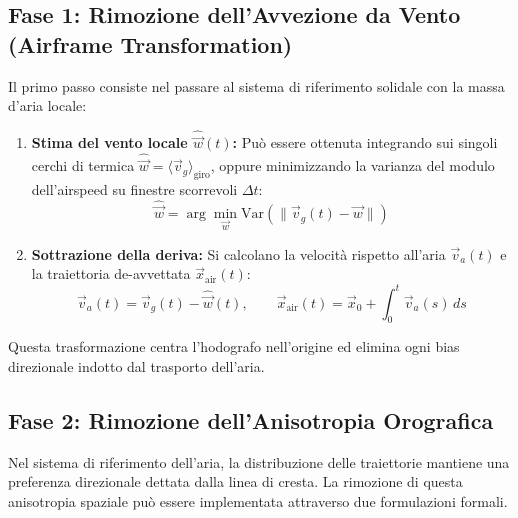 \documentclass[11pt,a4paper]{article}
\begin{document}
\subsection{Fase 1: Rimozione dell'Avvezione da Vento (Airframe Transformation)}
Il primo passo consiste nel passare al sistema di riferimento solidale con la massa d'aria locale:
\begin{enumerate}
    \item \textbf{Stima del vento locale $\hat{\vec{w}}(t)$:}
    Pu\`o essere ottenuta integrando sui singoli cerchi di termica $\hat{\vec{w}} = \langle \vec{v}_g \rangle_{\text{giro}}$, oppure minimizzando la varianza del modulo dell'airspeed su finestre scorrevoli $\Delta t$:
    \begin{equation}
        \hat{\vec{w}} = \arg\min_{\vec{w}} \mathrm{Var}\left( \|\vec{v}_g(t) - \vec{w}\| \right)
    \end{equation}
    \item \textbf{Sottrazione della deriva:}
    Si calcolano la velocit\`a rispetto all'aria $\vec{v}_a(t)$ e la traiettoria de-avvettata $\vec{x}_{\text{air}}(t)$:
    \begin{equation}
        \vec{v}_a(t) = \vec{v}_g(t) - \hat{\vec{w}}(t), \qquad \vec{x}_{\text{air}}(t) = \vec{x}_0 + \int_0^t \vec{v}_a(s)\,ds
    \end{equation}
\end{enumerate}
Questa trasformazione centra l'hodografo nell'origine ed elimina ogni bias direzionale indotto dal trasporto dell'aria.

\subsection{Fase 2: Rimozione dell'Anisotropia Orografica}
Nel sistema di riferimento dell'aria, la distribuzione delle traiettorie mantiene una preferenza direzionale dettata dalla linea di cresta. La rimozione di questa anisotropia spaziale pu\`o essere implementata attraverso due formulazioni formali.
\end{document}
